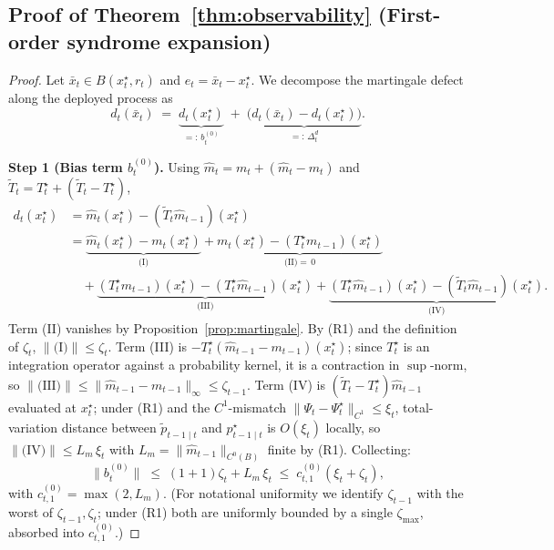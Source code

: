 \documentclass{article}
\theoremstyle{plain}
\theoremstyle{definition}
\theoremstyle{remark}
\begin{document}
\subsection{Proof of Theorem~\ref{thm:observability}
            (First-order syndrome expansion)}
\label{app:thm_obs}

\begin{proof}
Let \(\bar x_t \in B(x_t^\star, r_t)\) and \(e_t = \bar x_t - x_t^\star\).
We decompose the martingale defect along the deployed process as
\begin{equation}
d_t(\bar x_t)
\;=\;
\underbrace{d_t(x_t^\star)}_{=:\,b_t^{(0)}}
\;+\;
\underbrace{\bigl(d_t(\bar x_t) - d_t(x_t^\star)\bigr)}_{=:\,\Delta_t^d}.
\label{eq:app_obs_split}
\end{equation}

\textbf{Step 1 (Bias term \(b_t^{(0)}\)).}
Using \(\hat m_t = m_t + (\hat m_t - m_t)\) and
\(\tilde T_t = T_t^\star + (\tilde T_t - T_t^\star)\),
\begin{align}
d_t(x_t^\star)
&= \hat m_t(x_t^\star) - (\tilde T_t \hat m_{t-1})(x_t^\star) \nonumber\\
&= \underbrace{\hat m_t(x_t^\star) - m_t(x_t^\star)}_{\text{(I)}}
 + \underbrace{m_t(x_t^\star) - (T_t^\star m_{t-1})(x_t^\star)}_{\text{(II)}=\,0} \nonumber\\
&\quad
 + \underbrace{(T_t^\star m_{t-1})(x_t^\star) - (T_t^\star \hat m_{t-1})(x_t^\star)}_{\text{(III)}}
 + \underbrace{(T_t^\star \hat m_{t-1})(x_t^\star) - (\tilde T_t \hat m_{t-1})(x_t^\star)}_{\text{(IV)}}.
\label{eq:app_obs_four_terms}
\end{align}
Term (II) vanishes by Proposition~\ref{prop:martingale}. By (R1) and the
definition of \(\zeta_t\), \(\|\text{(I)}\| \le \zeta_t\). Term (III) is
\(-T_t^\star(\hat m_{t-1} - m_{t-1})(x_t^\star)\); since \(T_t^\star\) is an
integration operator against a probability kernel, it is a contraction in
\(\sup\)-norm, so
\(\|\text{(III)}\| \le \|\hat m_{t-1}-m_{t-1}\|_\infty \le \zeta_{t-1}\).
Term (IV) is \((\tilde T_t - T_t^\star)\hat m_{t-1}\) evaluated at
\(x_t^\star\); under (R1) and the \(C^1\)-mismatch
\(\|\Psi_t - \Psi_t^\star\|_{C^1} \le \xi_t\), total-variation distance between
\(\tilde p_{t-1\mid t}\) and \(p^\star_{t-1\mid t}\) is
\(O(\xi_t)\) locally, so \(\|\text{(IV)}\| \le L_{m}\,\xi_t\) with
\(L_m = \|\hat m_{t-1}\|_{C^0(B)}\) finite by (R1). Collecting:
\begin{equation}
\|b_t^{(0)}\| \;\le\; (1+1)\zeta_t + L_m\,\xi_t
   \;\le\; c_{t,1}^{(0)}(\xi_t + \zeta_t),
\label{eq:app_obs_b0_bound}
\end{equation}
with \(c_{t,1}^{(0)} = \max(2, L_m)\). (For notational uniformity we
identify \(\zeta_{t-1}\) with the worst of \(\zeta_{t-1},\zeta_t\); under
(R1) both are uniformly bounded by a single \(\zeta_{\max}\), absorbed into
\(c_{t,1}^{(0)}\).)


\end{proof}
\end{document}
